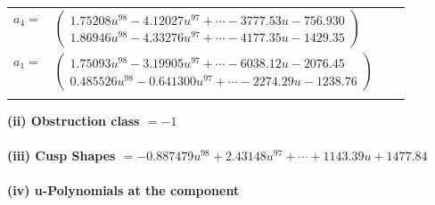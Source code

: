 \documentclass[1p]{elsarticle_modified}
\theoremstyle{definition}
\begin{document}
\begin{tabular}{m{7pt} m{180pt} m{7pt} m{180pt} }
\flushright $a_{4}=$&$\begin{pmatrix}1.75208 u^{98}-4.12027 u^{97}+\cdots-3777.53 u-756.930\\1.86946 u^{98}-4.33276 u^{97}+\cdots-4177.35 u-1429.35\end{pmatrix}$ \\
\flushright $a_{1}=$&$\begin{pmatrix}1.75093 u^{98}-3.19905 u^{97}+\cdots-6038.12 u-2076.45\\0.485526 u^{98}-0.641300 u^{97}+\cdots-2274.29 u-1238.76\end{pmatrix}$\\&\end{tabular}
\flushleft \textbf{(ii) Obstruction class $= -1$}\\~\\
\flushleft \textbf{(iii) Cusp Shapes $= -0.887479 u^{98}+2.43148 u^{97}+\cdots+1143.39 u+1477.84$}\\~\\
\newpage\renewcommand{\arraystretch}{1}
\flushleft \textbf{(iv) u-Polynomials at the component}\newline \\
\end{document}
